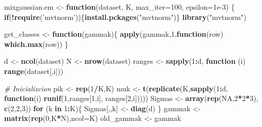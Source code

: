 \documentclass[11pt,]{article}
\newenvironment{Shaded}{\begin{snugshade}}{\end{snugshade}}
\newcommand{\KeywordTok}[1]{\textcolor[rgb]{0.13,0.29,0.53}{\textbf{#1}}}
\newcommand{\DataTypeTok}[1]{\textcolor[rgb]{0.13,0.29,0.53}{#1}}
\newcommand{\DecValTok}[1]{\textcolor[rgb]{0.00,0.00,0.81}{#1}}
\newcommand{\FloatTok}[1]{\textcolor[rgb]{0.00,0.00,0.81}{#1}}
\newcommand{\StringTok}[1]{\textcolor[rgb]{0.31,0.60,0.02}{#1}}
\newcommand{\CommentTok}[1]{\textcolor[rgb]{0.56,0.35,0.01}{\textit{#1}}}
\newcommand{\OtherTok}[1]{\textcolor[rgb]{0.56,0.35,0.01}{#1}}
\newcommand{\ControlFlowTok}[1]{\textcolor[rgb]{0.13,0.29,0.53}{\textbf{#1}}}
\newcommand{\OperatorTok}[1]{\textcolor[rgb]{0.81,0.36,0.00}{\textbf{#1}}}
\newcommand{\NormalTok}[1]{#1}
\begin{document}
\begin{Shaded}
\begin{Highlighting}[]
\NormalTok{mixgaussian.em <-}\StringTok{ }\ControlFlowTok{function}\NormalTok{(dataset, K, }\DataTypeTok{max_iter=}\DecValTok{100}\NormalTok{, }\DataTypeTok{epsilon=}\FloatTok{1e-3}\NormalTok{) \{}
  \ControlFlowTok{if}\NormalTok{(}\OperatorTok{!}\KeywordTok{require}\NormalTok{(}\StringTok{'mvtnorm'}\NormalTok{))\{}\KeywordTok{install.pckages}\NormalTok{(}\StringTok{"mvtnorm"}\NormalTok{)\}}
  \KeywordTok{library}\NormalTok{(}\StringTok{"mvtnorm"}\NormalTok{)}

\NormalTok{  get_classes <-}\StringTok{ }\ControlFlowTok{function}\NormalTok{(gammak)\{}
    \KeywordTok{apply}\NormalTok{(gammak,}\DecValTok{1}\NormalTok{,}\ControlFlowTok{function}\NormalTok{(row) }\KeywordTok{which.max}\NormalTok{(row))}
\NormalTok{  \}}
  
\NormalTok{  d <-}\StringTok{ }\KeywordTok{ncol}\NormalTok{(dataset)}
\NormalTok{  N <-}\StringTok{ }\KeywordTok{nrow}\NormalTok{(dataset)}
\NormalTok{  ranges <-}\StringTok{ }\KeywordTok{sapply}\NormalTok{(}\DecValTok{1}\OperatorTok{:}\NormalTok{d, }\ControlFlowTok{function}\NormalTok{ (i) }\KeywordTok{range}\NormalTok{(dataset[,i]))}
  
  \CommentTok{# Inicializcion}
\NormalTok{  pik <-}\StringTok{ }\KeywordTok{rep}\NormalTok{(}\DecValTok{1}\OperatorTok{/}\NormalTok{K,K)}
\NormalTok{  muk <-}\StringTok{ }\KeywordTok{t}\NormalTok{(}\KeywordTok{replicate}\NormalTok{(K,}\KeywordTok{sapply}\NormalTok{(}\DecValTok{1}\OperatorTok{:}\NormalTok{d, }
                        \ControlFlowTok{function}\NormalTok{(i) }\KeywordTok{runif}\NormalTok{(}\DecValTok{1}\NormalTok{,ranges[}\DecValTok{1}\NormalTok{,i], ranges[}\DecValTok{2}\NormalTok{,i]))))}
\NormalTok{  Sigmas <-}\StringTok{ }\KeywordTok{array}\NormalTok{(}\KeywordTok{rep}\NormalTok{(}\OtherTok{NA}\NormalTok{,}\DecValTok{2}\OperatorTok{*}\DecValTok{2}\OperatorTok{*}\DecValTok{3}\NormalTok{), }\KeywordTok{c}\NormalTok{(}\DecValTok{2}\NormalTok{,}\DecValTok{2}\NormalTok{,}\DecValTok{3}\NormalTok{)) }
  \ControlFlowTok{for}\NormalTok{ (k }\ControlFlowTok{in} \DecValTok{1}\OperatorTok{:}\NormalTok{K)\{}
\NormalTok{    Sigmas[,,k] <-}\StringTok{ }\KeywordTok{diag}\NormalTok{(d)}
\NormalTok{   \}}
\NormalTok{  gammak <-}\StringTok{ }\KeywordTok{matrix}\NormalTok{(}\KeywordTok{rep}\NormalTok{(}\DecValTok{0}\NormalTok{,K}\OperatorTok{*}\NormalTok{N),}\DataTypeTok{ncol=}\NormalTok{K)}
\NormalTok{  old_gammak <-}\StringTok{ }\NormalTok{gammak}


\end{Highlighting}
\end{Shaded}
\end{document}
